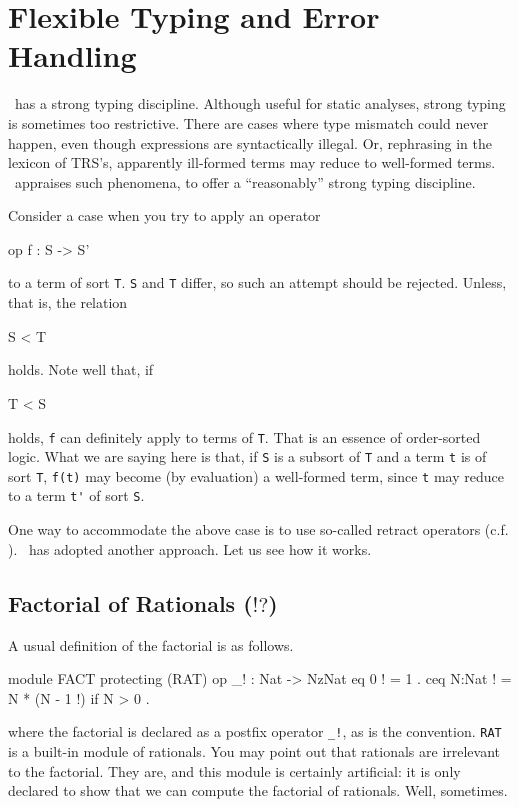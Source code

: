 \documentclass[a4paper]{memoir}
\begin{document}
\section{Flexible Typing and Error Handling}\label{sec:p2-flexible-typing}

\cafeobj~has a strong typing discipline. Although useful for static
analyses, strong typing is sometimes too restrictive. There are cases
where type mismatch could never happen, even though expressions are
syntactically illegal. Or, rephrasing in the lexicon of TRS's,
apparently ill-formed terms may reduce to well-formed terms.
\cafeobj~appraises such phenomena, to offer
a ``reasonably'' strong typing discipline.

Consider a case when you try to apply an operator
\begin{vvtm}
\begin{ccode}
  op f : S -> S'
\end{ccode}
\end{vvtm}
to a term of sort \verb|T|. \verb|S| and \verb|T| differ, so such an
attempt should be rejected. Unless, that is, the relation
\begin{vvtm}
\begin{ccode}
  S < T
\end{ccode}
\end{vvtm}
holds. Note well that, if
\begin{vvtm}
\begin{ccode}
  T < S
\end{ccode}
\end{vvtm}
holds, \verb|f| can definitely apply to terms of \verb|T|. That is
an essence of order-sorted logic. What we are saying here is that,
if \verb|S| is a subsort of \verb|T| and a term \verb|t| is
of sort \verb|T|, \verb|f(t)|
may become (by evaluation) a well-formed term, since \verb|t| may
reduce to a term \verb|t'| of sort \verb|S|.

One way to accommodate the above case is to use so-called retract operators
(c.f. \cite{OBJ}).
\cafeobj~has adopted another approach. Let us see how it works.

\subsection{Factorial of Rationals ($!?$)}

A usual definition of the factorial is as follows.
\label{exs:fact}
\begin{vvtm}
\begin{ccode}
  module FACT {
   protecting (RAT)
   op _! : Nat -> NzNat
   eq 0 ! = 1 .
   ceq N:Nat ! = N * (N - 1 !) if N > 0 .
  }
\end{ccode}
\end{vvtm}
where the factorial is declared as a postfix operator \verb|_!|, as
is the convention. \verb|RAT| is a built-in module of rationals.
You may point out that rationals are irrelevant to the factorial. They
are, and this module is certainly artificial: it is only declared to show
that we can compute the factorial of rationals. Well, sometimes.
\end{document}
